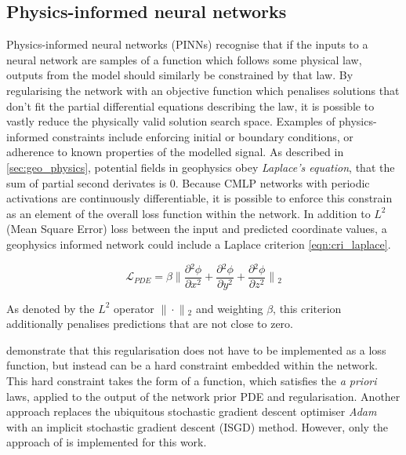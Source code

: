 \documentclass[manuscript.tex]{subfiles}
\begin{document}
\subsection{Physics-informed neural networks}
Physics-informed neural networks (PINNs) recognise that if the inputs to a neural network are samples of a function which follows some physical law, outputs from the model should similarly be constrained by that law.
By regularising the network with an objective function which penalises solutions that don't fit the partial differential equations describing the law, it is possible to vastly reduce the physically valid solution search space.
Examples of physics-informed constraints include enforcing initial or boundary conditions, or adherence to known properties of the modelled signal.
As described in \cref{sec:geo_physics}, potential fields in geophysics obey \emph{Laplace's equation}, that the sum of partial second derivates is 0.
Because CMLP networks with periodic activations are continuously differentiable, it is possible to enforce this constrain as an element of the overall loss function within the network.
In addition to \(L^2\) (Mean Square Error) loss between the input and predicted coordinate values, a geophysics informed network could include a Laplace criterion \cref*{eqn:cri_laplace}.

\begin{equation}
    \label{eqn:cri_laplace}
    \mathcal{L}_{PDE} = \beta{}\lVert{}\frac{\partial{}^2\phi}{\partial{}x^2} + \frac{\partial{}^2\phi}{\partial{}y^2} + \frac{\partial{}^2\phi}{\partial{}z^2}\rVert{}_{2}
\end{equation}

As denoted by the \(L^2\) operator \(\lVert{}\cdot{}\rVert{}_{2}\) and weighting \(\beta{}\), this criterion additionally penalises predictions that are not close to zero.

\Textcite{sethiHardEnforcementPhysicsinformed2023} demonstrate that this regularisation does not have to be implemented as a loss function, but instead can be a hard constraint embedded within the network.
This hard constraint takes the form of a function, which satisfies the \emph{a priori} laws, applied to the output of the network prior PDE and regularisation.
Another approach \parencite{liImplicitStochasticGradient2023} replaces the ubiquitous stochastic gradient descent optimiser \emph{Adam} with an implicit stochastic gradient descent (ISGD) method.
However, only the approach of \textcite{benbarkaSeeingImplicitNeural2022} is implemented for this work.
\end{document}
